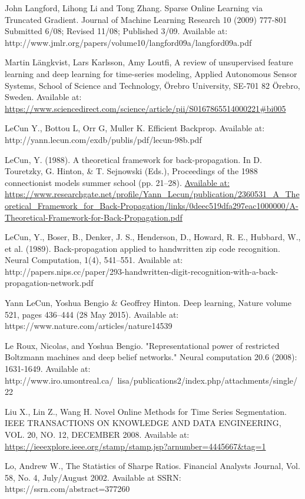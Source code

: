 \documentclass[a4paper,latin]{paper}
\begin{document}
\begin{thebibliography}{9}
John Langford, Lihong Li and Tong Zhang. Sparse Online Learning via Truncated 
Gradient. Journal of Machine Learning Research 10 (2009) 777-801 Submitted 6/08; Revised 11/08; Published 
3/09. Available at: http://www.jmlr.org/papers/volume10/langford09a/langford09a.pdf 

Martin Längkvist, Lars Karlsson,  Amy Loutfi, A review of unsupervised feature learning and deep learning for time-series 
modeling, Applied Autonomous Sensor Systems, School of Science and Technology, Örebro University, SE-701 82 Örebro, 
Sweden. Available at: \url{https://www.sciencedirect.com/science/article/pii/S0167865514000221#bi005}

LeCun Y., Bottou L, Orr G, Muller K. Efficient Backprop. Available at: http://yann.lecun.com/exdb/publis/pdf/lecun-98b.pdf

LeCun, Y. (1988). A theoretical framework for back-propagation. In D. Touretzky,
G. Hinton, \& T. Sejnowski (Eds.), Proceedings of the 1988 connectionist models summer school (pp. 21–28).
\url{Available at: https://www.researchgate.net/profile/Yann_Lecun/publication/2360531_A_Theoretical_Framework_for_Back-Propagation/links/0deec519dfa297eac1000000/A-Theoretical-Framework-for-Back-Propagation.pdf}

LeCun, Y., Boser, B., Denker, J. S., Henderson, D., Howard, R. E., Hubbard, W., et al.
(1989). Back-propagation applied to handwritten zip code recognition. Neural
Computation, 1(4), 541–551. Available at: http://papers.nips.cc/paper/293-handwritten-digit-recognition-with-a-back-propagation-network.pdf

Yann LeCun, Yoshua Bengio \& Geoffrey Hinton. Deep learning, Nature volume 521, pages 436–444 (28 May 
2015). Available at: https://www.nature.com/articles/nature14539

Le Roux, Nicolas, and Yoshua Bengio. "Representational power of restricted Boltzmann machines and deep belief networks." Neural computation 20.6 (2008): 1631-1649.
Available at: http://www.iro.umontreal.ca/~lisa/publications2/index.php/attachments/single/22

Liu X., Lin Z., Wang H. Novel Online Methods for Time Series Segmentation.  IEEE TRANSACTIONS ON KNOWLEDGE AND DATA ENGINEERING, VOL. 20, NO. 12, DECEMBER 
2008. Available at: \url{https://ieeexplore.ieee.org/stamp/stamp.jsp?arnumber=4445667&tag=1}

Lo, Andrew W., The Statistics of Sharpe Ratios. Financial Analysts Journal, Vol. 58, No. 4, July/August 2002. Available at SSRN: https://ssrn.com/abstract=377260


\end{thebibliography}
\end{document}
